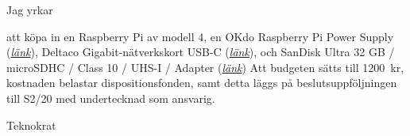 \documentclass[10pt]{article}
\begin{document}
Jag yrkar 


   \begin{attsatser}
        \att att köpa in en Raspberry Pi av modell 4, en OKdo Raspberry Pi Power Supply (\href{https://www.webhallen.com/se/product/303341-Raspberry-Pi-4-Model-B-enkortsdator-4GB?ref=Prisjakt}{\textit{länk}}), Deltaco Gigabit-nätverkskort USB-C (\href{https://www.webhallen.com/se/product/287806-Deltaco-Gigabit-natverkskort-USB-C?fbclid=IwAR3cwUUneeHwetV2Wf9Af0kFY3SdnuOUb7dO--YaVZ8iGAKfFJYGQpZ74Ak}{\textit{länk}}), och SanDisk Ultra 32 GB / microSDHC / Class 10 / UHS-I / Adapter (\href{https://www.webhallen.com/se/product/276923-SanDisk-Ultra-32-GB-microSDHC-Class-10-UHS-I-Adapter?fbclid=IwAR1CDnflZ2lyeXEtmu_JbxddqwOeaVz4IcyH0Fv1HP7R38Z0Q6yOYFrgsZ0}{\textit{länk}})
        \att Att budgeten sätts till \SI{1200}{kr},
        \att kostnaden belastar dispositionsfonden, samt
        \att detta läggs på beslutsuppföljningen till S2/20 med undertecknad som ansvarig. 
    \end{attsatser}
    
    
    \begin{signatures}{1}
    \signature{Jonathan Benitez}{Teknokrat}
    \end{signatures}

   
    
\end{document}
